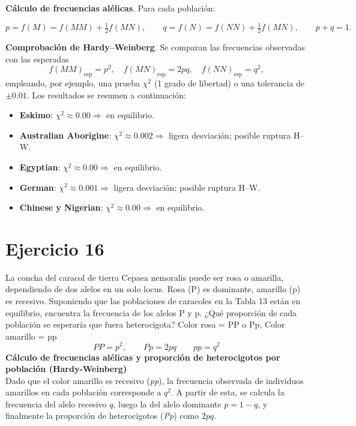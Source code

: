\documentclass{article}
\begin{document}
\vspace{1em}
\noindent
\textbf{Cálculo de frecuencias alélicas}.  
Para cada población:

\[
p = f(M) = f(MM) + \tfrac12 f(MN), 
\qquad
q = f(N) = f(NN) + \tfrac12 f(MN),
\qquad
p+q=1.
\]

\textbf{Comprobación de Hardy–Weinberg}.  
Se comparan las frecuencias observadas con las esperadas
\[
f(MM)_{\text{esp}} = p^{2}, \quad
f(MN)_{\text{esp}} = 2pq, \quad
f(NN)_{\text{esp}} = q^{2},
\]
empleando, por ejemplo, una prueba \(\chi^{2}\) (1 grado de libertad) o una tolerancia de \(\pm 0.01\).  
Los resultados se resumen a continuación:

\begin{itemize}
  \item \textbf{Eskimo}: \(\chi^{2} \approx 0.00 \Rightarrow\) en equilibrio.
  \item \textbf{Australian Aborigine}: \(\chi^{2} \approx 0.002 \Rightarrow\) ligera desviación; posible ruptura H–W.
  \item \textbf{Egyptian}: \(\chi^{2}\approx 0.00 \Rightarrow\) en equilibrio.
  \item \textbf{German}: \(\chi^{2}\approx 0.001 \Rightarrow\) ligera desviación; posible ruptura H–W.
  \item \textbf{Chinese y Nigerian}: \(\chi^{2}\approx 0.00 \Rightarrow\) en equilibrio.
\end{itemize}
\section{Ejercicio 16}
La concha del caracol de tierra Cepaea nemoralis puede ser rosa o amarilla, dependiendo de dos alelos en un solo locus. Rosa (P) es dominante, amarillo (p) es recesivo. Suponiendo que las poblaciones de caracoles en la Tabla 13 están en equilibrio, encuentra la frecuencia de los alelos P y p. ¿Qué proporción de cada población se esperaría que fuera heterocigota?
Color rosa = PP o Pp, Color amarillo = pp
\[PP = p^{2}, \qquad Pp = 2pq  \qquad pp = q^{2}\]
\textbf{Cálculo de frecuencias alélicas y proporción de heterocigotos por población (Hardy-Weinberg)}\\
Dado que el color amarillo es recesivo (\textit{pp}), la frecuencia observada de individuos amarillos en cada población corresponde a \( q^2 \). A partir de esta, se calcula la frecuencia del alelo recesivo \( q \), luego la del alelo dominante \( p = 1 - q \), y finalmente la proporción de heterocigotos (\textit{Pp}) como \( 2pq \).
\end{document}
